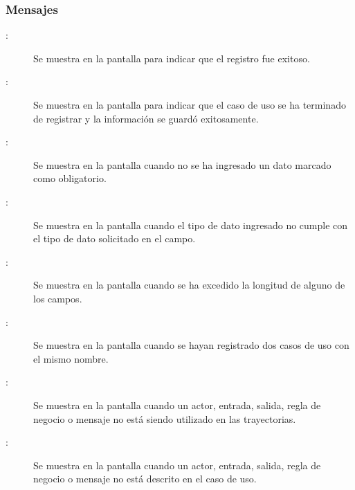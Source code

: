 \subsubsection{Mensajes}

	
\begin{description}
	\item[ :] Se muestra en la pantalla  para indicar que el registro fue exitoso.
	\item[ :] Se muestra en la pantalla  para indicar que el 
	caso de uso se ha terminado de registrar y la información se guardó exitosamente.
	\item[ :] Se muestra en la pantalla  cuando no se ha ingresado un dato marcado como obligatorio.
	\item[ :] Se muestra en la pantalla  cuando el tipo de dato ingresado no cumple con el tipo de dato solicitado en el campo.
	\item[ :] Se muestra en la pantalla  cuando se ha excedido la longitud de alguno de los campos.
	\item[ :] Se muestra en la pantalla  cuando se hayan registrado dos casos de uso con el mismo nombre.
	\item[:] Se muestra en la pantalla  cuando un actor, entrada, salida, regla de negocio o mensaje no está siendo utilizado en las trayectorias.
	\item[:] Se muestra en la pantalla  cuando un actor, entrada, salida, regla de negocio o mensaje no está descrito en el caso de uso.
\end{description}
